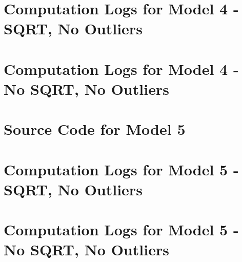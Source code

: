 \begin{landscape}
    \section{Computation Logs for Model 4 - SQRT, No Outliers}
    


    \newpage
    \section{Computation Logs for Model 4 - No SQRT, No Outliers}
    


\end{landscape}

\newpage
\section{Source Code for Model 5}


\begin{landscape}
    \section{Computation Logs for Model 5 - SQRT, No Outliers}
    


    \newpage
    \section{Computation Logs for Model 5 - No SQRT, No Outliers}
    

\end{landscape}


% 

